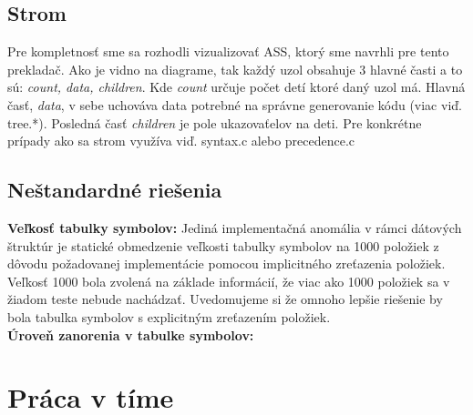 \documentclass[a4paper, 12pt]{article}
\begin{document}
	\subsection{Strom}
	\begin{figure}
	\end{figure}
	Pre kompletnosť sme sa rozhodli vizualizovať ASS, ktorý sme navrhli pre tento prekladač.
	Ako je vidno na diagrame, tak každý uzol obsahuje 3 hlavné časti a to sú: \textit{count, data, children}. Kde \textit{count}
	určuje počet detí ktoré daný uzol má. Hlavná časť, \textit{data}, v sebe uchováva data potrebné na správne generovanie kódu
	(viac viď. tree.*). Posledná časť \textit{children} je pole ukazovaťelov na deti. Pre konkrétne prípady ako sa strom využíva viď.
	syntax.c alebo precedence.c\\
	
	\subsection{Neštandardné riešenia}
	\textbf{Veľkosť tabulky symbolov: } Jediná implementačná anomália v rámci dátových štruktúr je 
	statické obmedzenie veľkosti tabulky symbolov na 
	1000 položiek z dôvodu požadovanej implementácie pomocou implicitného zreťazenia položiek. Veľkosť 1000 bola zvolená 
	na základe informácií, že viac ako 1000 položiek sa v žiadom teste nebude nachádzať. Uvedomujeme si že omnoho lepšie riešenie by bola tabulka symbolov s explicitným zreťazením položiek.\\
	\textbf{Úroveň zanorenia v tabulke symbolov: }
	\newpage
	
	\section{Práca v tíme}
	
\end{document}
